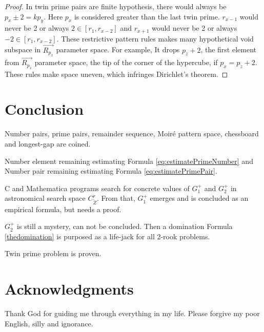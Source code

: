 \documentclass[twocolumn]{article}%
\theoremstyle{definition}
\theoremstyle{remark}
\begin{document}
\begin{proof}
In twin prime pairs are finite hypothesis, there would always be $p_x \pm 2=kp_y$. Here $p_x$ is considered greater than the last twin prime.  $r_{x-1}$ would never be 2 or always $2\in[r_{1},r_{x-2}]$ and $r_{x+1}$ would never be 2 or always $-2\in[r_{1},r_{x-2}]$.
These restrictive pattern rules makes many hypothetical void subspace in $\overrightarrow{R_{p_x}}$ parameter space. For example, It drops $p_{z}+2$, the first element from $\overrightarrow{R_{p_x}}$ parameter space, the tip of the corner of the hypercube, if $p_{x}=p_{\dot{z}}+2$. These rules make space uneven, which infringes Dirichlet's theorem.
\end{proof}

\section*{Conclusion}

Number pairs, prime pairs, remainder sequence, Moiré pattern space, chessboard and longest-gap are coined.

Number element remaining estimating Formula \eqref{eq:estimatePrimeNumber} and Number pair remaining estimating Formula \eqref{eq:estimatePrimePair}.

C and Mathematica programs search for concrete values of $G_1^{+}$ and $G_2^{+}$ in astronomical search space  $C_{\mathring{Z}}^{\dot{r}}$. From that, $G_1^{+}$ emerges and is concluded as an empirical formula, but needs a proof.

$G_2^{+}$ is still a mystery, can not be concluded. Then a domination Formula \eqref{thedomination} is purposed as a life-jack for all 2-rook problems.

Twin prime problem is proven.

%
%
\section*{Acknowledgments}
Thank God for guiding me through everything in my life. Please forgive my poor English, silly and ignorance.
\end{document}
